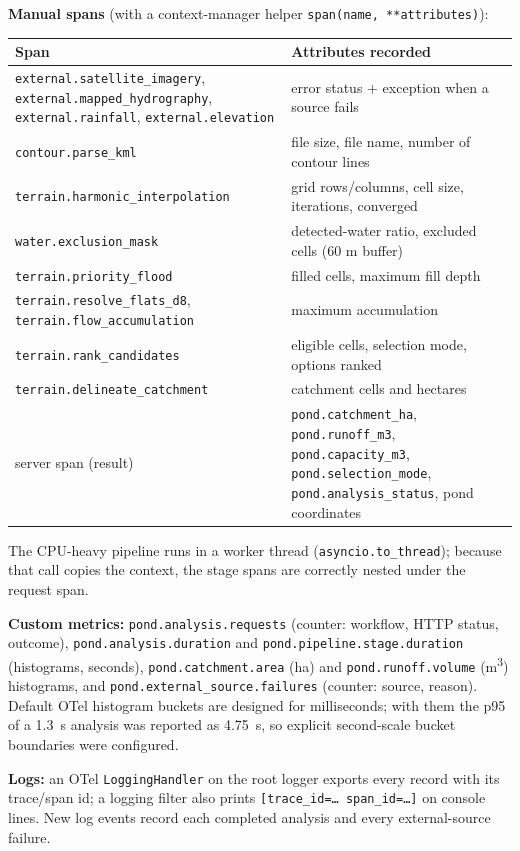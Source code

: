 \documentclass[10.5pt,a4paper]{article}
\begin{document}
\textbf{Manual spans} (with a context-manager helper \texttt{span(name, **attributes)}):
\begin{center}\small
\begin{tabularx}{\linewidth}{@{}>{\raggedright\arraybackslash}p{6.4cm}X@{}}\toprule
Span & Attributes recorded\\\midrule
\texttt{external.satellite\_imagery}, \texttt{external.mapped\_hydrography}, \texttt{external.rainfall}, \texttt{external.elevation} & error status + exception when a source fails\\
\texttt{contour.parse\_kml} & file size, file name, number of contour lines\\
\texttt{terrain.harmonic\_interpolation} & grid rows/columns, cell size, iterations, converged\\
\texttt{water.exclusion\_mask} & detected-water ratio, excluded cells (60 m buffer)\\
\texttt{terrain.priority\_flood} & filled cells, maximum fill depth\\
\texttt{terrain.resolve\_flats\_d8}, \texttt{terrain.flow\_accumulation} & maximum accumulation\\
\texttt{terrain.rank\_candidates} & eligible cells, selection mode, options ranked\\
\texttt{terrain.delineate\_catchment} & catchment cells and hectares\\
server span (result) & \texttt{pond.catchment\_ha}, \texttt{pond.runoff\_m3}, \texttt{pond.capacity\_m3}, \texttt{pond.selection\_mode}, \texttt{pond.analysis\_status}, pond coordinates\\\bottomrule
\end{tabularx}\end{center}
The CPU-heavy pipeline runs in a worker thread (\texttt{asyncio.to\_thread}); because that call copies the context, the stage spans are correctly nested under the request span.

\textbf{Custom metrics:} \texttt{pond.analysis.requests} (counter: workflow, HTTP status, outcome), \texttt{pond.analysis.duration} and \texttt{pond.pipeline.stage.duration} (histograms, seconds), \texttt{pond.catchment.area} (ha) and \texttt{pond.runoff.volume} (m\textsuperscript{3}) histograms, and \texttt{pond.external\_source.failures} (counter: source, reason). Default OTel histogram buckets are designed for milliseconds; with them the p95 of a 1.3~s analysis was reported as 4.75~s, so explicit second-scale bucket boundaries were configured.

\textbf{Logs:} an OTel \texttt{LoggingHandler} on the root logger exports every record with its trace/span id; a logging filter also prints \texttt{[trace\_id=… span\_id=…]} on console lines. New log events record each completed analysis and every external-source failure.
\end{document}
